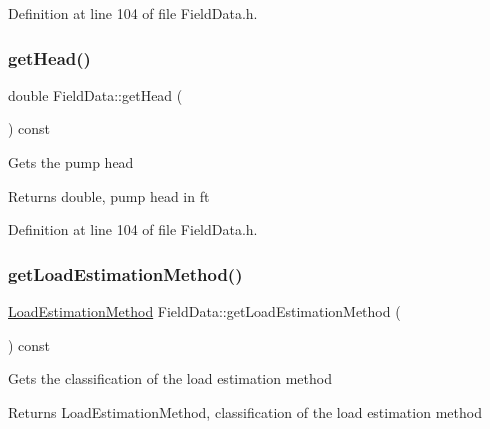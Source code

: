 Definition at line 104 of file Field\+Data.\+h.

\mbox{\label{class_field_data_ac3e8e0b2de226c858b6c92cdb454bd0d}} 
\subsubsection{\texorpdfstring{get\+Head()}{getHead()}\hspace{0.1cm}{\footnotesize\ttfamily [3/3]}}
{\footnotesize\ttfamily double Field\+Data\+::get\+Head (\begin{DoxyParamCaption}{ }\end{DoxyParamCaption}) const\hspace{0.3cm}{\ttfamily [inline]}}

Gets the pump head

\begin{DoxyReturn}{Returns}
double, pump head in ft 
\end{DoxyReturn}


Definition at line 104 of file Field\+Data.\+h.

\mbox{\label{class_field_data_ae213fa76dd005d7fd251ef26beecd311}} 
\subsubsection{\texorpdfstring{get\+Load\+Estimation\+Method()}{getLoadEstimationMethod()}\hspace{0.1cm}{\footnotesize\ttfamily [1/3]}}
{\footnotesize\ttfamily \hyperlink{class_field_data_a424e89914ba5684c01bb269dbe3312fd}{Load\+Estimation\+Method} Field\+Data\+::get\+Load\+Estimation\+Method (\begin{DoxyParamCaption}{ }\end{DoxyParamCaption}) const\hspace{0.3cm}{\ttfamily [inline]}}

Gets the classification of the load estimation method

\begin{DoxyReturn}{Returns}
Load\+Estimation\+Method, classification of the load estimation method 
\end{DoxyReturn}


